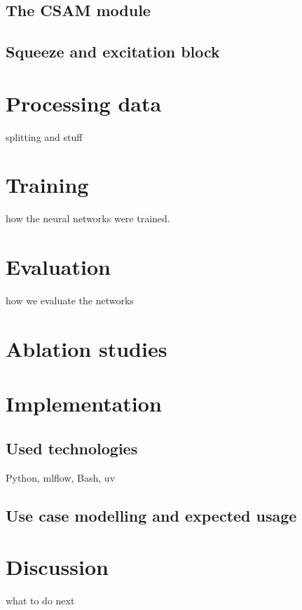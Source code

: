 \documentclass[
  digital,     %
  oneside,     %
  nosansbold,  %
  nocolorbold, %
  lof,         %
  lot,         %
]{fithesis4}
\begin{document}
\section{The CSAM module}

\section{Squeeze and excitation block}

\chapter{Processing data}
splitting and stuff

\chapter{Training}
how the neural networks were trained.

\chapter{Evaluation}
how we evaluate the networks

\chapter{Ablation studies}

\chapter{Implementation}

\section{Used technologies}
Python, mlflow, Bash, uv

\section{Use case modelling and expected usage}

\chapter{Discussion}
what to do next
\end{document}
